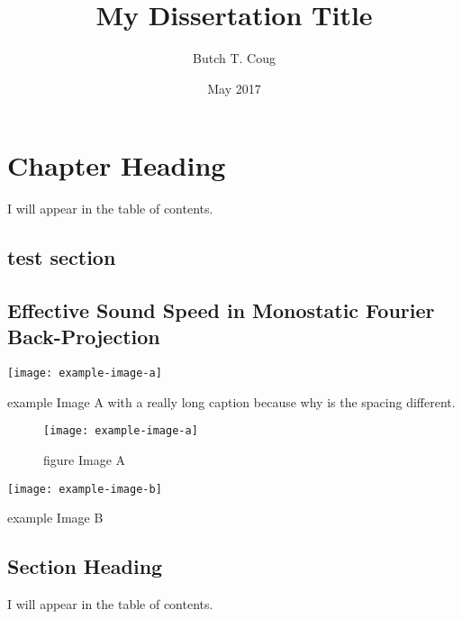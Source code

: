 \documentclass[
DToption=dissertation,%
wsudraft,
]{wsu}
\title{My Dissertation Title}
\author{Butch T. Coug}
\date{May 2017}
\begin{document}
\makeTitlePages

\makeSignaturePage

\begin{ackPage}
\lipsum[3]
\end{ackPage}

\begin{abstractPage}
\lipsum[4-5]
\end{abstractPage}

\tableofcontents\clearpage
\listoftables\clearpage
\listoffigures\clearpage
{}\clearpage


\chapter[Optional Chapter TOC Entry]{Chapter Heading}
I will appear in the table of contents.

\lipsum[1]

\section{test section}
\section{Effective Sound Speed in Monostatic Fourier Back-Projection}

\begin{example}
	\texttt{[image: example-image-a]}
	\caption{example Image A with a really long caption because why is the spacing different.}
\end{example}

\begin{figure}
	\texttt{[image: example-image-a]}
	\caption{figure Image A}
\end{figure}

\begin{example}
	\texttt{[image: example-image-b]}
	\caption{example Image B}
\end{example}


\section{Section Heading}
I will appear in the table of contents.
\end{document}
